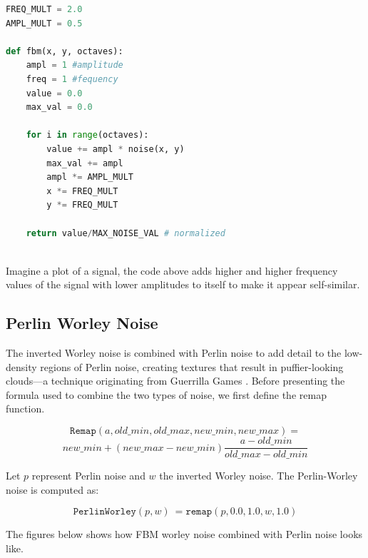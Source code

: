 \begin{lstlisting}[language=Python]
FREQ_MULT = 2.0
AMPL_MULT = 0.5

def fbm(x, y, octaves):
	ampl = 1 #amplitude
    freq = 1 #fequency
    value = 0.0
    max_val = 0.0
    
    for i in range(octaves):
        value += ampl * noise(x, y)
        max_val += ampl 
        ampl *= AMPL_MULT
        x *= FREQ_MULT
        y *= FREQ_MULT
    
    return value/MAX_NOISE_VAL # normalized
			
\end{lstlisting}

Imagine a plot of a signal, the code above adds higher and higher frequency values of the signal with lower amplitudes to itself to make it appear self-similar.

\subsection{Perlin Worley Noise}
The inverted Worley noise is combined with Perlin noise to add detail to the low-density regions of Perlin noise, creating textures that result in puffier-looking clouds—a technique originating from Guerrilla Games \cite{guerrillagames2025nubis}. Before presenting the formula used to combine the two types of noise, we first define the remap function.
\begin{definition}
    \[\texttt{Remap}(a, old\_min, old\_max, new\_min, new\_max) =\]
    \[new\_min + 
    (new\_max - new\_min)\frac{a-old\_min}{old\_max - old\_min}\]
\end{definition}

Let \( p \) represent Perlin noise and \( w \) the inverted Worley noise. The Perlin-Worley noise is computed as:
\begin{definition}
    \[
    \texttt{PerlinWorley}(p, w)\ = \texttt{remap}(p, 0.0, 1.0, w, 1.0) 
    \]
\end{definition}

The figures below shows how FBM worley noise combined with Perlin noise looks like.

